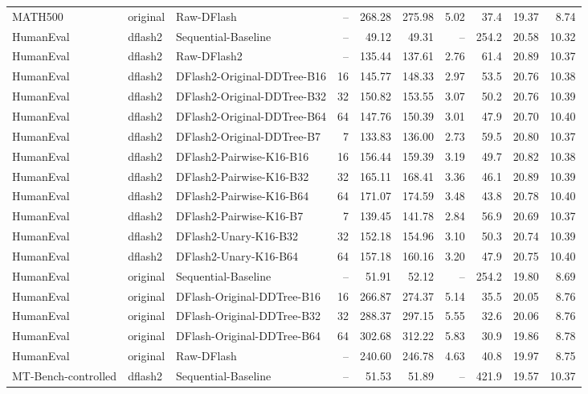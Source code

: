 \begin{longtable}{lllrrrrrrr}
MATH500 & original & Raw-DFlash & -- & 268.28 & 275.98 & 5.02 & 37.4 & 19.37 & 8.74 \\
HumanEval & dflash2 & Sequential-Baseline & -- & 49.12 & 49.31 & -- & 254.2 & 20.58 & 10.32 \\
HumanEval & dflash2 & Raw-DFlash2 & -- & 135.44 & 137.61 & 2.76 & 61.4 & 20.89 & 10.37 \\
HumanEval & dflash2 & DFlash2-Original-DDTree-B16 & 16 & 145.77 & 148.33 & 2.97 & 53.5 & 20.76 & 10.38 \\
HumanEval & dflash2 & DFlash2-Original-DDTree-B32 & 32 & 150.82 & 153.55 & 3.07 & 50.2 & 20.76 & 10.39 \\
HumanEval & dflash2 & DFlash2-Original-DDTree-B64 & 64 & 147.76 & 150.39 & 3.01 & 47.9 & 20.70 & 10.40 \\
HumanEval & dflash2 & DFlash2-Original-DDTree-B7 & 7 & 133.83 & 136.00 & 2.73 & 59.5 & 20.80 & 10.37 \\
HumanEval & dflash2 & DFlash2-Pairwise-K16-B16 & 16 & 156.44 & 159.39 & 3.19 & 49.7 & 20.82 & 10.38 \\
HumanEval & dflash2 & DFlash2-Pairwise-K16-B32 & 32 & 165.11 & 168.41 & 3.36 & 46.1 & 20.89 & 10.39 \\
HumanEval & dflash2 & DFlash2-Pairwise-K16-B64 & 64 & 171.07 & 174.59 & 3.48 & 43.8 & 20.78 & 10.40 \\
HumanEval & dflash2 & DFlash2-Pairwise-K16-B7 & 7 & 139.45 & 141.78 & 2.84 & 56.9 & 20.69 & 10.37 \\
HumanEval & dflash2 & DFlash2-Unary-K16-B32 & 32 & 152.18 & 154.96 & 3.10 & 50.3 & 20.74 & 10.39 \\
HumanEval & dflash2 & DFlash2-Unary-K16-B64 & 64 & 157.18 & 160.16 & 3.20 & 47.9 & 20.75 & 10.40 \\
HumanEval & original & Sequential-Baseline & -- & 51.91 & 52.12 & -- & 254.2 & 19.80 & 8.69 \\
HumanEval & original & DFlash-Original-DDTree-B16 & 16 & 266.87 & 274.37 & 5.14 & 35.5 & 20.05 & 8.76 \\
HumanEval & original & DFlash-Original-DDTree-B32 & 32 & 288.37 & 297.15 & 5.55 & 32.6 & 20.06 & 8.76 \\
HumanEval & original & DFlash-Original-DDTree-B64 & 64 & 302.68 & 312.22 & 5.83 & 30.9 & 19.86 & 8.78 \\
HumanEval & original & Raw-DFlash & -- & 240.60 & 246.78 & 4.63 & 40.8 & 19.97 & 8.75 \\
MT-Bench-controlled & dflash2 & Sequential-Baseline & -- & 51.53 & 51.89 & -- & 421.9 & 19.57 & 10.37 \\

\end{longtable}
